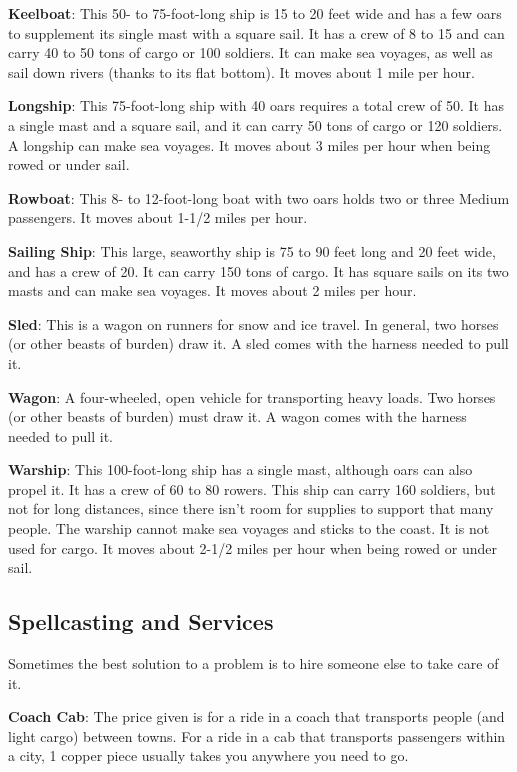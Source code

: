 \textbf{Keelboat}: This 50- to 75-foot-long ship is 15 to 20 feet wide and has a few oars to supplement its single mast with a square sail. It has a crew of 8 to 15 and can carry 40 to 50 tons of cargo or 100 soldiers. It can make sea voyages, as well as sail down rivers (thanks to its flat bottom). It moves about 1 mile per hour.
		
\textbf{Longship}: This 75-foot-long ship with 40 oars requires a total crew of 50. It has a single mast and a square sail, and it can carry 50 tons of cargo or 120 soldiers. A longship can make sea voyages. It moves about 3 miles per hour when being rowed or under sail.
		
\textbf{Rowboat}: This 8- to 12-foot-long boat with two oars holds two or three Medium passengers. It moves about 1-1/2 miles per hour.
		
\textbf{Sailing Ship}: This large, seaworthy ship is 75 to 90 feet long and 20 feet wide, and has a crew of 20. It can carry 150 tons of cargo. It has square sails on its two masts and can make sea voyages. It moves about 2 miles per hour.
		
\textbf{Sled}: This is a wagon on runners for snow and ice travel. In general, two horses (or other beasts of burden) draw it. A sled comes with the harness needed to pull it.
		
\textbf{Wagon}: A four-wheeled, open vehicle for transporting heavy loads. Two horses (or other beasts of burden) must draw it. A wagon comes with the harness needed to pull it.
		
\textbf{Warship}: This 100-foot-long ship has a single mast, although oars can also propel it. It has a crew of 60 to 80 rowers. This ship can carry 160 soldiers, but not for long distances, since there isn't room for supplies to support that many people. The warship cannot make sea voyages and sticks to the coast. It is not used for cargo. It moves about 2-1/2 miles per hour when being rowed or under sail.
	
\subsection{Spellcasting and Services}

		
Sometimes the best solution to a problem is to hire someone else to take care of it.
		
\textbf{Coach Cab}: The price given is for a ride in a coach that transports people (and light cargo) between towns. For a ride in a cab that transports passengers within a city, 1 copper piece usually takes you anywhere you need to go.
		
